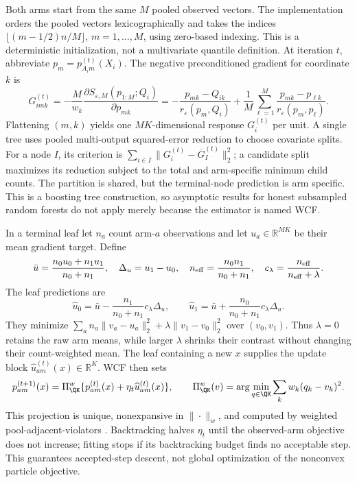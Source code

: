 Both arms start from the same $M$ pooled observed vectors. The implementation orders the pooled vectors lexicographically and takes the indices $\lfloor(m-1/2)n/M\rfloor$, $m=1,\ldots,M$, using zero-based indexing. This is a deterministic initialization, not a multivariate quantile definition. At iteration $t$, abbreviate $p_m=p_{A_i m}^{(t)}(X_i)$. The negative preconditioned gradient for coordinate $k$ is
\begin{equation}
 G_{imk}^{(t)}=-\frac{M}{w_k}\frac{\partial S_{\varepsilon,M}(p_{1:M};Q_i)}{\partial p_{mk}}
 =-\frac{p_{mk}-Q_{ik}}{r_\varepsilon(p_m,Q_i)}
 +\frac1M\sum_{\ell=1}^M\frac{p_{mk}-p_{\ell k}}{r_\varepsilon(p_m,p_\ell)}.
 \label{eq:app-gradient}
\end{equation}
Flattening $(m,k)$ yields one $MK$-dimensional response $G_i^{(t)}$ per unit. A single tree uses pooled multi-output squared-error reduction to choose covariate splits. For a node $I$, its criterion is $\sum_{i\in I}\|G_i^{(t)}-\overline G_I^{(t)}\|_2^2$; a candidate split maximizes its reduction subject to the total and arm-specific minimum child counts. The partition is shared, but the terminal-node prediction is arm specific. This is a boosting tree construction, so asymptotic results for honest subsampled random forests do not apply merely because the estimator is named WCF.

In a terminal leaf let $n_a$ count arm-$a$ observations and let $u_a\in\mathbb R^{MK}$ be their mean gradient target. Define
\[
 \bar u=\frac{n_0u_0+n_1u_1}{n_0+n_1},\quad
 \Delta_u=u_1-u_0,\quad n_{\rm eff}=\frac{n_0n_1}{n_0+n_1},\quad
 c_\lambda=\frac{n_{\rm eff}}{n_{\rm eff}+\lambda}.
\]
The leaf predictions are
\[
 \widehat u_0=\bar u-\frac{n_1}{n_0+n_1}c_\lambda\Delta_u,\qquad
 \widehat u_1=\bar u+\frac{n_0}{n_0+n_1}c_\lambda\Delta_u.
\]
They minimize $\sum_a n_a\|v_a-u_a\|_2^2+\lambda\|v_1-v_0\|_2^2$ over $(v_0,v_1)$. Thus $\lambda=0$ retains the raw arm means, while larger $\lambda$ shrinks their contrast without changing their count-weighted mean. The leaf containing a new $x$ supplies the update block $\widehat u_{am}^{(t)}(x)\in\mathbb R^K$. WCF then sets
\[
 p_{am}^{(t+1)}(x)=\Pi_{\QK}^w\{p_{am}^{(t)}(x)+\eta_t\widehat u_{am}^{(t)}(x)\},\qquad
 \Pi_{\QK}^w(v)=\arg\min_{q\in\QK}\sum_k w_k(q_k-v_k)^2.
\]
This projection is unique, nonexpansive in $\|\cdot\|_w$, and computed by weighted pool-adjacent-violators \citep{barlow1972isotonic}. Backtracking halves $\eta_t$ until the observed-arm objective does not increase; fitting stops if its backtracking budget finds no acceptable step. This guarantees accepted-step descent, not global optimization of the nonconvex particle objective.

